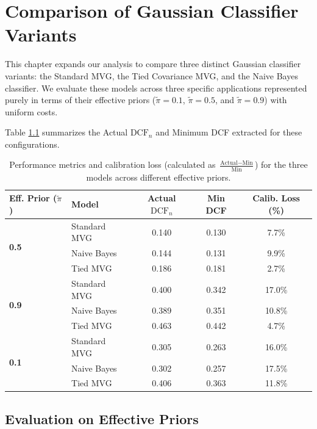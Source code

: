 \chapter{Comparison of Gaussian Classifier Variants}
\label{chap:variants_comparison}

This chapter expands our analysis to compare three distinct Gaussian classifier variants: the Standard MVG, the Tied Covariance MVG, and the Naive Bayes classifier. We evaluate these models across three specific applications represented purely in terms of their effective priors ($\tilde{\pi} = 0.1$, $\tilde{\pi} = 0.5$, and $\tilde{\pi} = 0.9$) with uniform costs.

Table \ref{tab:comparison_results} summarizes the Actual $\text{DCF}_n$ and Minimum DCF extracted for these configurations.

\begin{table}[htbp]
    \centering
    \small 
    \begin{tabular}{llccc}
        \toprule
        \textbf{Eff. Prior ($\tilde{\pi}$)} & \textbf{Model} & \textbf{Actual $\text{DCF}_n$} & \textbf{Min DCF} & \textbf{Calib. Loss (\%)} \\
        \midrule
        \multirow{3}{*}{\textbf{0.5}} 
        & Standard MVG & 0.140 & 0.130 & 7.7\% \\
        & Naive Bayes  & 0.144 & 0.131 & 9.9\% \\
        & Tied MVG     & 0.186 & 0.181 & 2.7\% \\
        \midrule
        \multirow{3}{*}{\textbf{0.9}} 
        & Standard MVG & 0.400 & 0.342 & 17.0\% \\
        & Naive Bayes  & 0.389 & 0.351 & 10.8\% \\
        & Tied MVG     & 0.463 & 0.442 & 4.7\% \\
        \midrule
        \multirow{3}{*}{\textbf{0.1}} 
        & Standard MVG & 0.305 & 0.263 & 16.0\% \\
        & Naive Bayes  & 0.302 & 0.257 & 17.5\% \\
        & Tied MVG     & 0.406 & 0.363 & 11.8\% \\
        \bottomrule
    \end{tabular}
    \caption{Performance metrics and calibration loss (calculated as $\frac{\text{Actual} - \text{Min}}{\text{Min}}$) for the three models across different effective priors.}
    \label{tab:comparison_results}
\end{table}

\section{Evaluation on Effective Priors}

